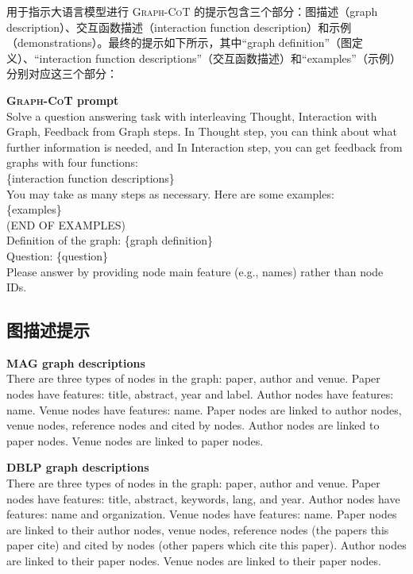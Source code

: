 \documentclass[11pt,UTF8,fontset=fandol]{ctexart}
\newenvironment{promptbox}{%
  \par\noindent\begin{minipage}{\linewidth}\centering
  \begin{minipage}{0.95\linewidth}\small\itshape
}{%
  \end{minipage}\end{minipage}\par\medskip
}
\begin{document}
用于指示大语言模型进行 \textsc{Graph-CoT} 的提示包含三个部分：图描述（graph description）、交互函数描述（interaction function description）和示例（demonstrations）。最终的提示如下所示，其中“graph definition”（图定义）、“interaction function descriptions”（交互函数描述）和“examples”（示例）分别对应这三个部分：

\begin{promptbox}
\textbf{\textsc{Graph-CoT} prompt}\\[4pt]
\normalfont Solve a question answering task with interleaving Thought, Interaction with Graph, Feedback from Graph steps. In Thought step, you can think about what further information is needed, and In Interaction step, you can get feedback from graphs with four functions:\\[4pt]
\{interaction function descriptions\}\\
You may take as many steps as necessary. Here are some examples:\\[4pt]
\{examples\}\\
(END OF EXAMPLES)\\
Definition of the graph: \{graph definition\}\\
Question: \{question\}\\
Please answer by providing node main feature (e.g., names) rather than node IDs.
\end{promptbox}

\subsection{图描述提示}

\begin{promptbox}
\textbf{MAG graph descriptions}\\[4pt]
\normalfont There are three types of nodes in the graph: paper, author and venue. Paper nodes have features: title, abstract, year and label. Author nodes have features: name. Venue nodes have features: name. Paper nodes are linked to author nodes, venue nodes, reference nodes and cited by nodes. Author nodes are linked to paper nodes. Venue nodes are linked to paper nodes.
\end{promptbox}

\begin{promptbox}
\textbf{DBLP graph descriptions}\\[4pt]
\normalfont There are three types of nodes in the graph: paper, author and venue. Paper nodes have features: title, abstract, keywords, lang, and year. Author nodes have features: name and organization. Venue nodes have features: name. Paper nodes are linked to their author nodes, venue nodes, reference nodes (the papers this paper cite) and cited by nodes (other papers which cite this paper). Author nodes are linked to their paper nodes. Venue nodes are linked to their paper nodes.
\end{promptbox}
\end{document}
